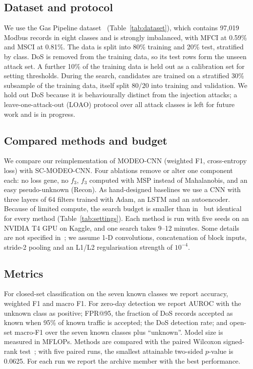 \documentclass[10pt,twocolumn,letterpaper]{article}
\begin{document}
\subsection{Dataset and protocol}
We use the Gas Pipeline dataset~\cite{morris2014gas}
(Table~\ref{tab:dataset}), which contains 97{,}019 Modbus records in eight
classes and is strongly imbalanced, with MFCI at 0.59\% and MSCI at
0.81\%. The data is split into 80\% training and 20\% test, stratified by
class. DoS is removed from the training data, so its test rows form the
unseen attack set. A further 10\% of the training data is held out as a
calibration set for setting thresholds. During the search, candidates are
trained on a stratified 30\% subsample of the training data, itself split
80/20 into training and validation. We hold out DoS because it is
behaviourally distinct from the injection attacks; a leave-one-attack-out
(LOAO) protocol over all attack classes is left for future work and is in
progress.

\subsection{Compared methods and budget}
We compare our reimplementation of MODEO-CNN (weighted F1, cross-entropy
loss) with SC-MODEO-CNN. Four ablations remove or alter one component
each: no loss gene, no $f_3$, $f_3$ computed with MSP instead of
Mahalanobis, and an easy pseudo-unknown (Recon). As hand-designed
baselines we use a CNN with three layers of 64 filters trained with Adam,
an LSTM and an autoencoder. Because of limited compute, the search budget
is smaller than in~\cite{lu2025modeo} but identical for every method
(Table~\ref{tab:settings}). Each method is run with five seeds on an
NVIDIA T4 GPU on Kaggle, and one search takes 9--12 minutes. Some details
are not specified in~\cite{lu2025modeo}; we assume 1-D convolutions,
concatenation of block inputs, stride-2 pooling and an L1/L2 regularisation
strength of $10^{-4}$.

\subsection{Metrics}
For closed-set classification on the seven known classes we report
accuracy, weighted F1 and macro F1. For zero-day detection we report AUROC
with the unknown class as positive; FPR@95, the fraction of DoS records
accepted as known when 95\% of known traffic is accepted; the DoS
detection rate; and open-set macro-F1 over the seven known classes plus
``unknown''. Model size is measured in MFLOPs. Methods are compared with
the paired Wilcoxon signed-rank test~\cite{wilcoxon1945}; with five paired
runs, the smallest attainable two-sided $p$-value is 0.0625. For each run
we report the archive member with the best performance.
\end{document}
